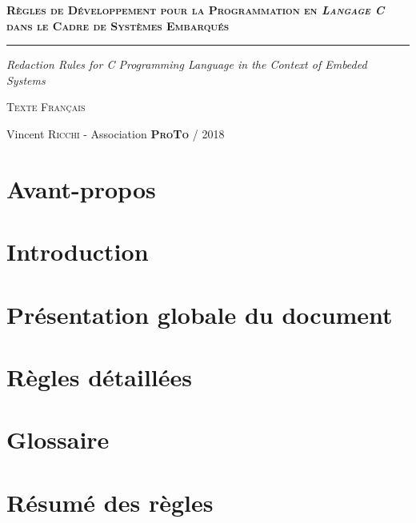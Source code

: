 \documentclass[a4paper, titlepage]{article}
\begin{document}
\begin{titlepage}
  \begin{flushleft}\huge\bfseries\scshape
    Règles de Développement pour la Programmation en \textit{Langage C} dans le Cadre de Systèmes Embarqués
  \end{flushleft}
  \hrule
  \begin{flushright}\LARGE\slshape
    Redaction Rules for C Programming Language in the Context of Embeded Systems
  \end{flushright}
  \begin{center}
  	\Large\textsc{Texte Français}
  \end{center}  
  \begin{center}
    Vincent \textsc{Ricchi} - Association \textsc{\textbf{ProTo}} / 2018
  \end{center}
\end{titlepage}


\part*{Avant-propos}


\tableofcontents

\pagebreak

\part{Introduction}


\part{Présentation globale du document}


\part{Règles détaillées}








\appendix

\pagebreak

\part*{Glossaire}


\pagebreak

\part*{Résumé des règles}

\end{document}
